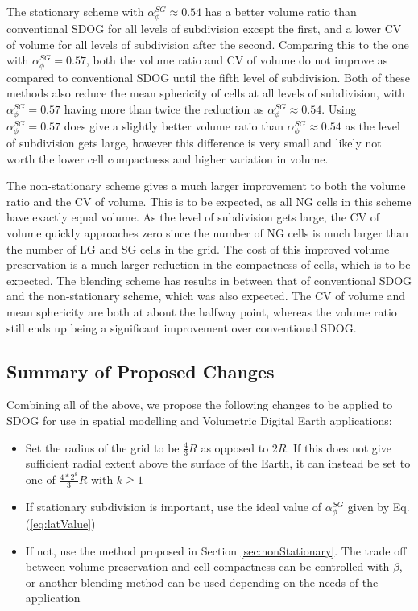 The stationary scheme with $\alpha_{\phi}^{SG} \approx 0.54$ has a better volume ratio than conventional SDOG for all levels of subdivision except the first, and a lower CV of volume for all levels of subdivision after the second. Comparing this to the one with $\alpha_{\phi}^{SG} = 0.57$, both the volume ratio and CV of volume do not improve as compared to conventional SDOG until the fifth level of subdivision. Both of these methods also reduce the mean sphericity of cells at all levels of subdivision, with $\alpha_{\phi}^{SG} = 0.57$ having more than twice the reduction as $\alpha_{\phi}^{SG} \approx 0.54$. Using $\alpha_{\phi}^{SG} = 0.57$ does give a slightly better volume ratio than $\alpha_{\phi}^{SG} \approx 0.54$ as the level of subdivision gets large, however this difference is very small and likely not worth the lower cell compactness and higher variation in volume. 

The non-stationary scheme gives a much larger improvement to both the volume ratio and the CV of volume. This is to be expected, as all NG cells in this scheme have exactly equal volume. As the level of subdivision gets large, the CV of volume quickly approaches zero since the number of NG cells is much larger than the number of LG and SG cells in the grid. The cost of this improved volume preservation is a much larger reduction in the compactness of cells, which is to be expected. The blending scheme has results in between that of conventional SDOG and the non-stationary scheme, which was also expected. The CV of volume and mean sphericity are both at about the halfway point, whereas the volume ratio still ends up being a significant improvement over conventional SDOG. 


\subsection{Summary of Proposed Changes}
Combining all of the above, we propose the following changes to be applied to SDOG for use in spatial modelling and Volumetric Digital Earth applications:
%
\begin{itemize}
	\item Set the radius of the grid to be $\frac{4}{3}R$ as opposed to $2R$. If this does not give sufficient radial extent above the surface of the Earth, it can instead be set to one of $\frac{4*2^{k}}{3} R$ with $k \ge 1$
	\item If stationary subdivision is important, use the ideal value of $\alpha_{\phi}^{SG}$ given by Eq. (\ref{eq:latValue})
	\item If not, use the method proposed in Section \ref{sec:nonStationary}. The trade off between volume preservation and cell compactness can be controlled with $\beta$, or another blending method can be used depending on the needs of the application
\end{itemize}
%



